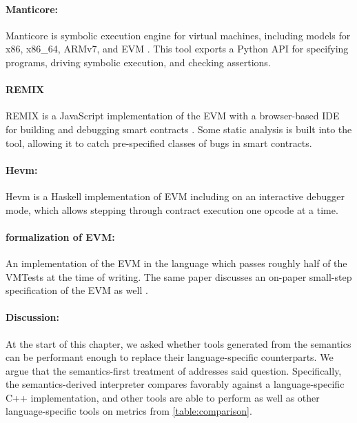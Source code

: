 \paragraph{Manticore:}
Manticore is symbolic execution engine for virtual machines, including models for x86, x86\_64, ARMv7, and EVM
\cite{ManticoreUrl}.
This tool exports a Python API for specifying programs, driving symbolic execution, and checking assertions.

\paragraph{REMIX}
REMIX is a JavaScript implementation of the EVM with a browser-based IDE for building and debugging smart contracts
\cite{RemixUrl}.
Some static analysis is built into the tool, allowing it to catch pre-specified classes of bugs in smart contracts.

\paragraph{Hevm:}
Hevm \cite{HevmUrl} is a Haskell implementation of EVM including on an interactive debugger mode, which allows stepping through contract execution one opcode at a time.

\paragraph{\Fstar{} formalization of EVM:}
An implementation of the EVM in the \Fstar{} language \cite{FstarUrl}
 which passes roughly half of the VMTests at the time of writing.
The same paper discusses an on-paper small-step specification of the EVM as well
\cite{GrishchenkoETAPS18}.

\paragraph{Discussion:}
At the start of this chapter, we asked whether tools generated from
the semantics can be performant enough to replace their language-specific
counterparts. We argue that the semantics-first treatment of
\KEVM{} addresses said question. Specifically, the
semantics-derived interpreter compares favorably against a language-specific
C++ implementation, and other tools are able to perform as well as
other language-specific tools on metrics from \autoref{table:comparison}.

